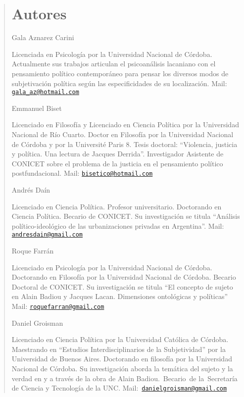 \begin{quote}
\backmatter
\section{Autores}

Gala Aznarez Carini

Licenciada en Psicología por la Universidad Nacional de Córdoba. Actualmente sus trabajos articulan el psicoanálisis lacaniano con el pensamiento político contemporáneo para pensar los diversos modos de subjetivación política según las especificidades de su localización. Mail: \href{mailto:gala_az@hotmail.com}{\nolinkurl{gala\_az@hotmail.com}}

Emmanuel Biset

Licenciado en Filosofía y Licenciado en Ciencia Política por la Universidad Nacional de Río Cuarto. Doctor en Filosofía por la Universidad Nacional de Córdoba y por la Université Paris 8. Tesis doctoral: \enquote{Violencia, justicia y política. Una lectura de Jacques Derrida}. Investigador Asistente de CONICET sobre el problema de la justicia en el pensamiento político postfundacional. Mail: \href{mailto:bisetico@hotmail.com}{\nolinkurl{bisetico@hotmail.com}}

Andrés Daín

Licenciado en Ciencia Política. Profesor universitario. Doctorando en Ciencia Política. Becario de CONICET. Su investigación se titula \enquote{Análisis político-ideológico de las urbanizaciones privadas en Argentina}. Mail: \href{mailto:andresdain@gmail.com}{\nolinkurl{andresdain@gmail.com}}

Roque Farrán

Licenciado en Psicología por la Universidad Nacional de Córdoba. Doctorando en Filosofía por la Universidad Nacional de Córdoba. Becario Doctoral de CONICET. Su investigación se titula \enquote{El concepto de sujeto en Alain Badiou y Jacques Lacan. Dimensiones ontológicas y políticas} Mail: \href{mailto:roquefarran@gmail.com}{\nolinkurl{roquefarran@gmail.com}}

Daniel Groisman

Licenciado en Ciencia Política por la Universidad Católica de Córdoba. Maestrando en \enquote{Estudios Interdisciplinarios de la Subjetividad} por la Universidad de Buenos Aires. Doctorando en filosofía por la Universidad Nacional de Córdoba. Su investigación aborda la temática del sujeto y la verdad en y a través de la obra de Alain Badiou.~Becario~de la~Secretaría de Ciencia y Tecnología de la UNC. Mail:~\href{mailto:danielgroisman@gmail.com}{\nolinkurl{danielgroisman@gmail.com}}


\end{quote}
